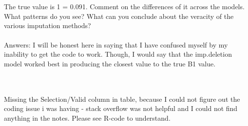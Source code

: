 \documentclass{article}
\begin{document}
\\~\\
The true value is
1 = 0.091. Comment on the differences of it across the models.
What patterns do you see? What can you conclude about the veracity of the various imputation methods?
\\~\\
Answers: I will be honest here in saying that I have confused myself by my inability to get the code to work. Though, I would say that the imp.deletion model worked best in producing the closest value to the true B1 value.

\\~\\
Missing the Selection/Valid column in table, because I could not figure out the coding issue i was having - stack overflow was not helpful and I could not find anything in the notes. Please see R-code to understand.
\end{document}

